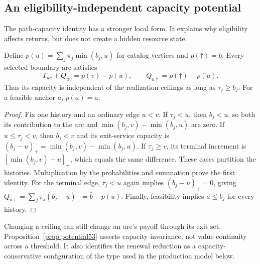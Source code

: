 \subsection{An eligibility-independent capacity potential}
The path-capacity identity has a stronger local form. It explains why eligibility affects returns, but does not create a hidden resource state.
\begin{proposition}\label{prop:potential53}
Define $p(u)=\sum_j\pi_j\min(b_j,u)$ for catalog vertices and $p(\dagger)=\bar b$. Every selected-boundary arc satisfies
\begin{equation}\label{eq:potential53}
 T_{uv}+Q_{uv}=p(v)-p(u),\qquad Q_{u\dagger}=p(\dagger)-p(u).
\end{equation}
Thus its capacity is independent of the realization ceilings as long as $\tau_j\geq b_j$. For a feasible anchor $a$, $p(a)=a$.
\end{proposition}
\begin{proof}
Fix one history and an ordinary edge $u<v$. If $\tau_j<u$, then $b_j<u$, so both its contribution to the arc and $\min(b_j,v)-\min(b_j,u)$ are zero. If $u\leq\tau_j<v$, then $b_j<v$ and its exit-service capacity is $(b_j-u)_+=\min(b_j,v)-\min(b_j,u)$. If $\tau_j\geq v$, its terminal increment is $[\min(b_j,v)-u]_+$, which equals the same difference. These cases partition the histories. Multiplication by the probabilities and summation prove the first identity. For the terminal edge, $\tau_j<u$ again implies $(b_j-u)_+=0$, giving $Q_{u\dagger}=\sum_j\pi_j(b_j-u)_+=\bar b-p(u)$. Finally, feasibility implies $a\leq b_j$ for every history.
\end{proof}
Changing a ceiling can still change an arc's payoff through its exit set. Proposition~\ref{prop:potential53} asserts capacity invariance, not value continuity across a threshold. It also identifies the renewal reduction as a capacity-conservative configuration of the type used in the production model below.

